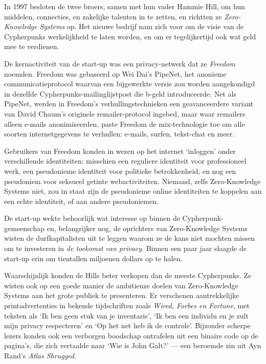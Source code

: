 \documentclass[smalldemyvopaper,11pt,twoside,onecolumn,openright,extrafontsizes,hidelinks]{memoir}
\begin{document}
In 1997 besloten de twee broers, samen met hun vader Hammie Hill, om hun
middelen, connecties, en zakelijke talenten in te zetten, en richtten ze
\emph{Zero-Knowledge Systems} op. Het nieuwe bedrijf nam zich voor om de
visie van de Cypherpunks werkelijkheid te laten worden, en om er
tegelijkertijd ook wat geld mee te verdienen.

De kernactiviteit van de start-up was een privacy-netwerk dat ze
\emph{Freedom} noemden. Freedom was gebaseerd op Wei Dai's PipeNet, het
anonieme communicatieprotocol waarvan een bijgewerkte versie zou worden
aangekondigd in dezelfde Cypherpunks-mailinglijstpost die b-geld
introduceerde. Net als PipeNet, werden in Freedom's
verhullingstechnieken een geavanceerdere variant van David Chaum's
originele remailer-protocol ingebed, maar waar remailers alleen e-mails
anonimiseerden, paste Freedom de mix-technologie toe om alle soorten
internetgegevens te verhullen: e-mails, surfen, tekst-chat en meer.

Gebruikers van Freedom konden in wezen op het internet `inloggen' onder
verschillende identiteiten: misschien een reguliere identiteit voor
professioneel werk, een pseudonieme identiteit voor politieke
betrokkenheid, en nog een pseudoniem voor seksueel getinte
webactiviteiten. Niemand, zelfs Zero-Knowledge Systems niet, zou in
staat zijn de pseudonieme online identiteiten te koppelen aan een echte
identiteit, of aan andere pseudoniemen.

De start-up wekte behoorlijk wat interesse op binnen de
Cypherpunk-gemeenschap en, belangrijker nog, de oprichters van
Zero-Knowledge Systems wisten de durfkapitalisten uit te leggen waarom
ze de kans niet mochten missen om te investeren in \emph{de toekomst van
privacy}. Binnen een paar jaar slaagde de start-up erin om tientallen
miljoenen dollars op te halen.

Waarschijnlijk konden de Hills beter verkopen dan de meeste Cypherpunks.
Ze wisten ook op een goede manier de ambitieuze doelen van
Zero-Knowledge Systems aan het grote publiek te presenteren. Er
verschenen aantrekkelijke printadvertenties in bekende tijdschriften
zoals \emph{Wired, Forbes en Fortune}, met teksten als `Ik ben geen stuk
van je inventaris', `Ik ben een individu en je zult mijn privacy
respecteren' en `Op het net heb ik de controle'. Bijzonder scherpe
lezers konden ook een verborgen boodschap ontrafelen uit een binaire
code op de pagina's, die zich vertaalde naar `Wie is John Galt?' --- een
beroemde zin uit Ayn Rand's \emph{Atlas Shrugged}.
\end{document}
